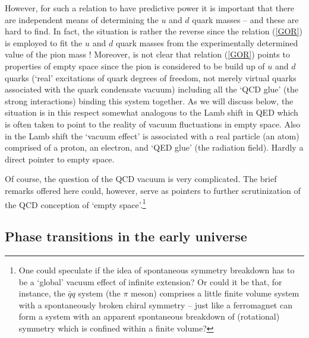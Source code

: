 \documentclass[12pt]{article}
\def\ss{\subsection}
\begin{document}
However, for such a relation to have predictive power it is
important that there are independent means of determining the $u$
and $d$ quark masses -- and these are hard to find. In fact, the
situation is rather the reverse since the relation (\ref{GOR}) is
employed to fit the $u$ and $d$ quark masses from the
experimentally determined value of the pion mass
\cite{weinberg77}! Moreover, is not clear that relation
(\ref{GOR}) points to properties of empty space since the pion is
considered to be build up of $u$ and $d$ quarks (`real'
excitations of quark degrees of freedom, not merely virtual quarks
associated with the quark condensate vacuum) including all the
`QCD glue' (the strong interactions) binding this system together.
As we will discuss below, the situation is in this respect
somewhat analogous to the Lamb shift in QED which is often taken
to point to the reality of vacuum fluctuations in empty space.
Also in the Lamb shift the `vacuum effect' is associated with a
real particle (an atom) comprised of a proton, an electron, and
`QED glue' (the radiation field). Hardly a direct pointer to empty
space.

Of course, the question of the QCD vacuum is very complicated. The
brief remarks offered here could, however, serve as pointers to
further scrutinization of the QCD conception of `empty
space'.\footnote{One could speculate if the idea of spontaneous
symmetry breakdown has to be a `global' vacuum effect of infinite
extension? Or could it be that, for instance, the $ \bar{q} q $
system (the $\pi$ meson) comprises a little finite volume system
with a spontaneously broken chiral symmetry -- just like a
ferromagnet can form a system with an apparent spontaneous
breakdown of (rotational) symmetry which is confined within a
finite volume?}



\ss{Phase transitions in the early universe}
\end{document}
